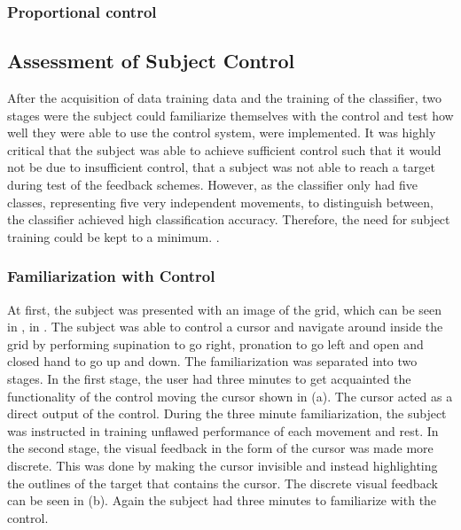 \subsubsection{Proportional control}  


\subsection{Assessment of Subject Control}

After the acquisition of data training data and the training of the classifier, two stages were the subject could familiarize themselves with the control and test how well they were able to use the control system, were implemented. It was highly critical that the subject was able to achieve sufficient control such that it would not be due to insufficient control, that a subject was not able to reach a target during test of the feedback schemes. However, as the classifier only had five classes, representing five very independent movements, to distinguish between, the classifier achieved high classification accuracy. Therefore, the need for subject training could be kept to a minimum. .  

\subsubsection{Familiarization with Control}

At first, the subject was presented with an image of the grid, which can be seen in , in . The subject was able to control a cursor and navigate around inside the grid by performing supination to go right, pronation to go left and open and closed hand to go up and down. The familiarization was separated into two stages. In the first stage, the user had three minutes to get acquainted the functionality of the control moving the cursor shown in  (a). The cursor acted as a direct output of the control. During the three minute familiarization, the subject was instructed in training unflawed performance of each movement and rest. In the second stage, the visual feedback in the form of the cursor was made more discrete. This was done by making the cursor invisible and instead highlighting the outlines of the target that contains the cursor. The discrete visual feedback can be seen in  (b). Again the subject had three minutes to familiarize with the control. 

